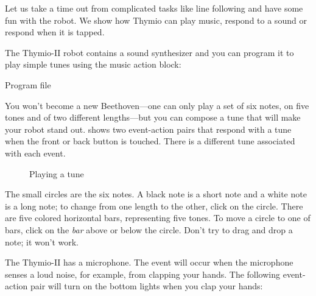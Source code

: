 \label{ch.bells}

Let us take a time out from complicated tasks like line following and
have some fun with the robot.
We show how Thymio can play music, respond to a sound or respond when it is tapped.


The Thymio-II robot contains a sound synthesizer and you can program it
to play simple tunes using the music action block: 

{\raggedleft \hfill Program file }

You won't become a new Beethoven---one can only play a set of six notes, on five tones and of two different lengths---but you can compose a
tune that will make your robot stand out.  shows
two event-action pairs that respond with a tune when the front or back
button is touched. There is a different tune associated with each event.

\begin{figure}
\begin{center}
\caption{Playing a tune}\label{fig.music}
\end{center}
\end{figure}

The small circles are the six notes.
A black note is a short note and a white note is a long note; to change from one length to the
other, click on the circle.
There are five colored horizontal bars, representing five tones.
To move a circle to one of bars, click on the \emph{bar} above or below the circle.
Don't try to drag and drop a note; it won't work.




The Thymio-II has a microphone. The event  will occur
when the microphone senses a loud noise, for example, from clapping your
hands. The following event-action pair will turn on the bottom lights
when you clap your hands: 


